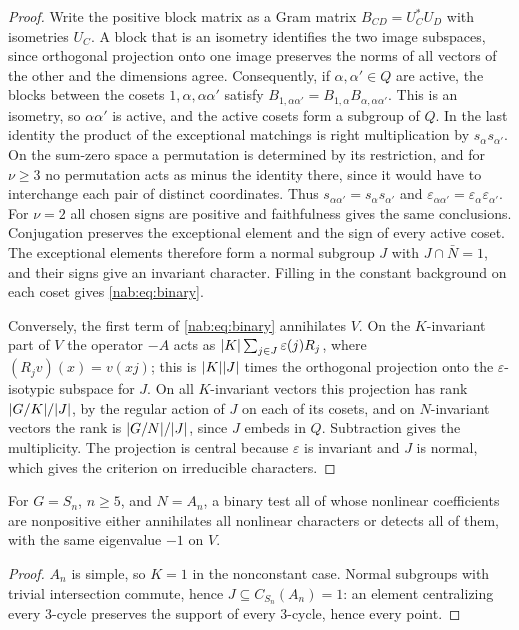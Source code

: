 \begin{proof}
Write the positive block matrix as a Gram matrix $B_{CD}=U_C^*U_D$ with isometries $U_C$.
A block that is an isometry identifies the two image subspaces, since orthogonal
projection onto one image preserves the norms of all vectors of the other and the
dimensions agree. Consequently, if $\alpha,\alpha'\in Q$ are active, the blocks between
the cosets $1,\alpha,\alpha\alpha'$ satisfy
$B_{1,\alpha\alpha'}=B_{1,\alpha}B_{\alpha,\alpha\alpha'}$. This is an isometry, so
$\alpha\alpha'$ is active, and the active cosets form a subgroup of $Q$. In the last
identity the product of the exceptional matchings is right multiplication by
$s_\alpha s_{\alpha'}$. On the sum-zero space a permutation is determined by its
restriction, and for $\nu\ge3$ no permutation acts as minus the identity there, since it
would have to interchange each pair of distinct coordinates. Thus
$s_{\alpha\alpha'}=s_\alpha s_{\alpha'}$ and
$\varepsilon_{\alpha\alpha'}=\varepsilon_\alpha\varepsilon_{\alpha'}$. For $\nu=2$ all
chosen signs are positive and faithfulness gives the same conclusions. Conjugation
preserves the exceptional element and the sign of every active coset. The exceptional
elements therefore form a normal subgroup $J$ with $J\cap\bar N=1$, and their signs give
an invariant character. Filling in the constant background on each coset gives
\eqref{nab:eq:binary}.

Conversely, the first term of \eqref{nab:eq:binary} annihilates $V$. On the $K$-invariant
part of $V$ the operator $-A$ acts as $\lvert K\rvert\sum_{j\in J}\varepsilon(j)R_j$, where
$(R_jv)(x)=v(xj)$; this is $\lvert K\rvert\lvert J\rvert$ times the orthogonal projection onto the
$\varepsilon$-isotypic subspace for $J$. On all $K$-invariant vectors this projection has
rank $\lvert G/K\rvert/\lvert J\rvert$, by the regular action of $J$ on each of its cosets, and on
$N$-invariant vectors the rank is $\lvert G/N\rvert/\lvert J\rvert$, since $J$ embeds in $Q$. Subtraction
gives the multiplicity. The projection is central because $\varepsilon$ is invariant and
$J$ is normal, which gives the criterion on irreducible characters.
\end{proof}

\begin{corollary}[\stU]\label{nab:cor:binarysn}
For $G=S_n$, $n\ge5$, and $N=A_n$, a binary test all of whose nonlinear coefficients are
nonpositive either annihilates all nonlinear characters or detects all of them, with the
same eigenvalue $-1$ on $V$.
\end{corollary}
\begin{proof}
$A_n$ is simple, so $K=1$ in the nonconstant case. Normal subgroups with trivial
intersection commute, hence $J\subseteq C_{S_n}(A_n)=1$: an element centralizing every
$3$-cycle preserves the support of every $3$-cycle, hence every point.
\end{proof}

